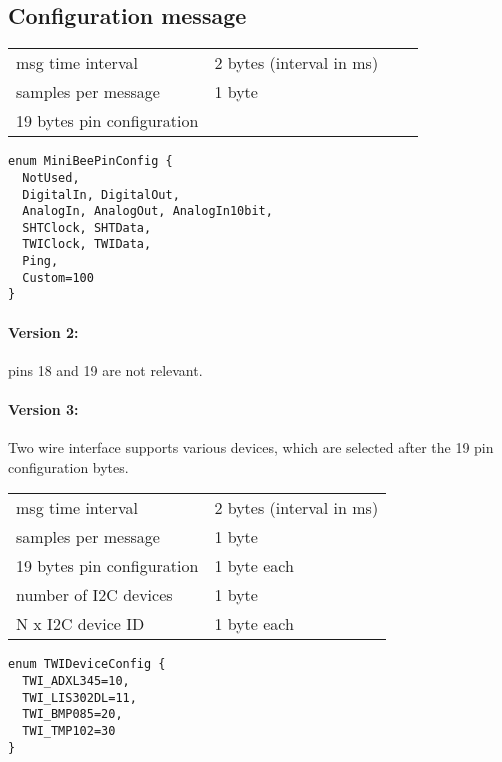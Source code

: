 \documentclass[letterpaper,10pt]{article}
\begin{document}
\subsection{Configuration message}

\begin{center}
\begin{tabular}{llll}
msg time interval & 2 bytes (interval in ms) & & \\
samples per message & 1 byte & & \\
19 bytes pin configuration& & \\
\end{tabular}
\end{center}

\begin{verbatim}
enum MiniBeePinConfig { 
  NotUsed,
  DigitalIn, DigitalOut,
  AnalogIn, AnalogOut, AnalogIn10bit, 
  SHTClock, SHTData, 
  TWIClock, TWIData,
  Ping,
  Custom=100
}
\end{verbatim}

\paragraph{Version 2:}
pins 18 and 19 are not relevant.

\paragraph{Version 3:}
Two wire interface supports various devices, which are selected after the 19 pin configuration bytes.

\begin{center}
\begin{tabular}{ll}
msg time interval & 2 bytes (interval in ms) \\
samples per message & 1 byte \\
19 bytes pin configuration& 1 byte each \\
number of I2C devices & 1 byte \\
N x I2C device ID & 1 byte each
\end{tabular}
\end{center}


\begin{verbatim}
enum TWIDeviceConfig { 
  TWI_ADXL345=10,
  TWI_LIS302DL=11,
  TWI_BMP085=20,
  TWI_TMP102=30
}
\end{verbatim}
\end{document}
